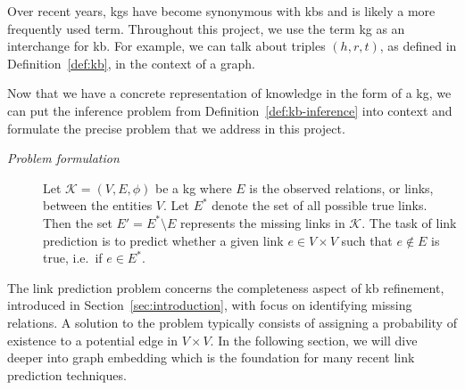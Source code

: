 Over recent years, \acp{kg} have become synonymous with \acp{kb} and is likely a more frequently used term.
Throughout this project, we use the term \ac{kg} as an interchange for \ac{kb}.
For example, we can talk about triples $(h, r, t)$, as defined in Definition~\ref{def:kb}, in the context of a graph.

Now that we have a concrete representation of knowledge in the form of a \ac{kg}, we can put the inference problem from Definition~\ref{def:kb-inference} into context and formulate the precise problem that we address in this project.

\begin{description}
  \item [\emph{Problem formulation}]
        Let $\mathcal{K} = (V, E, \phi)$ be a \ac{kg} where $E$ is the observed relations, or links, between the entities $V$.
        Let $E^*$ denote the set of all possible true links.
        Then the set $E' = E^* \setminus E$ represents the missing links in $\mathcal{K}$.
        The task of link prediction is to predict whether a given link $e \in V \times V$ such that $e \not\in E$ is true, i.e.\ if $e \in E^*$\cite{Li2018,Lue2011}.
\end{description}

The link prediction problem concerns the completeness aspect of \ac{kb} refinement, introduced in Section~\ref{sec:introduction}, with focus on identifying missing relations.
A solution to the problem typically consists of assigning a probability of existence to a potential edge in $V \times V$.
In the following section, we will dive deeper into graph embedding which is the foundation for many recent link prediction techniques.
